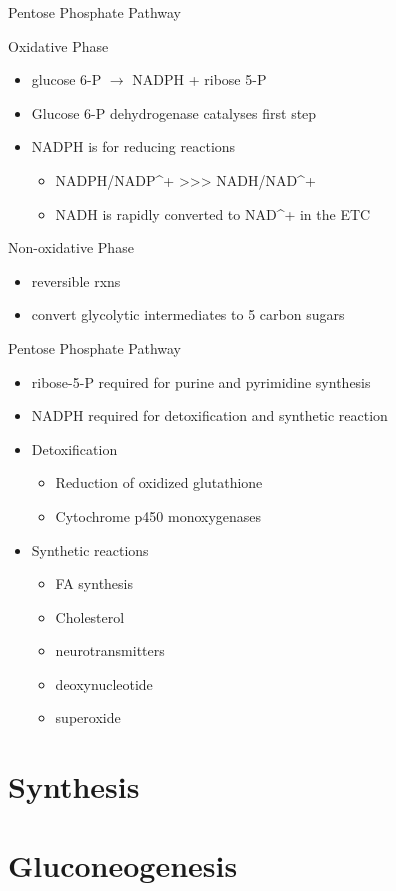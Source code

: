 \documentclass[presentation, smaller]{beamer}
\begin{document}
\begin{frame}[label={sec:orgeb96930}]{Pentose Phosphate Pathway}
\begin{block}{Oxidative Phase}
\begin{itemize}
\item glucose 6-P \(\to\) NADPH + ribose 5-P
\item Glucose 6-P dehydrogenase catalyses first step
\item NADPH is for reducing reactions
\begin{itemize}
\item NADPH/NADP\^{}+ \textgreater{}\textgreater{}\textgreater{} NADH/NAD\^{}+
\item NADH is rapidly converted to NAD\^{}+ in the ETC
\end{itemize}
\end{itemize}
\end{block}
\begin{block}{Non-oxidative Phase}
\begin{itemize}
\item reversible rxns
\item convert glycolytic intermediates to 5 carbon sugars
\end{itemize}
\end{block}
\end{frame}
\begin{frame}[label={sec:org1b1a5ac}]{Pentose Phosphate Pathway}
\begin{itemize}
\item ribose-5-P required for purine and pyrimidine synthesis
\item NADPH required for detoxification and synthetic reaction
\item Detoxification
\begin{itemize}
\item Reduction of oxidized glutathione
\item Cytochrome p450 monoxygenases
\end{itemize}
\item Synthetic reactions
\begin{itemize}
\item FA synthesis
\item Cholesterol
\item neurotransmitters
\item deoxynucleotide
\item superoxide
\end{itemize}
\end{itemize}
\end{frame}

\section{Synthesis}
\label{sec:orgd397ad3}
\section{Gluconeogenesis}
\label{sec:orgeeae2a2}
\end{document}
